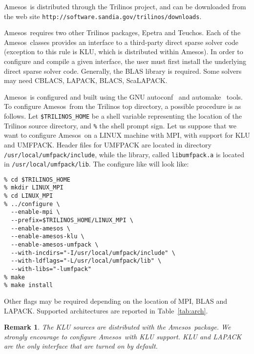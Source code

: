 \documentclass[11pt]{SANDreport}
\newcommand{\amesos}{{\sc Amesos}}
\newtheorem{remark}{Remark}
\begin{document}
\amesos\ is distributed through the Trilinos project, and can be
downloaded from the web site
\verb!http://software.sandia.gov/trilinos/downloads!.

\amesos\ requires two other {\sc Trilinos} packages, {\sc Epetra} and {\sc
  Teuchos}. 
Each of the \amesos\ classes provides an interface to a third-party direct
sparse solver code (exception to this rule is KLU, which is
  distributed within \amesos). In order to configure and compile a given
interface, the user must first install the underlying direct sparse
solver code. Generally, the BLAS library is required. Some solvers may
need CBLACS, LAPACK, BLACS, ScaLAPACK. 

\amesos\ is configured and built using the GNU autoconf~\cite{Autoconf}
and automake~\cite{Automake} tools. To configure \amesos\ from the
Trilinos top directory, a possible procedure is as follows.  Let
\verb!$TRILINOS_HOME! be a shell variable representing the location
of the Trilinos source directory, and \verb!%! the shell prompt sign.  
Let us suppose that we want to configure \amesos\ on a
LINUX machine with MPI, with support
for KLU and UMFPACK. Header files for UMFPACK are located
in directory \verb!/usr/local/umfpack/include!, while the library,
called \verb!libumfpack.a! is located in \verb!/usr/local/umfpack/lib!.
The configure like will look like:
\begin{verbatim}
% cd $TRILINOS_HOME
% mkdir LINUX_MPI
% cd LINUX_MPI
% ../configure \
  --enable-mpi \
  --prefix=$TRILINOS_HOME/LINUX_MPI \
  --enable-amesos \
  --enable-amesos-klu \
  --enable-amesos-umfpack \
  --with-incdirs="-I/usr/local/umfpack/include" \
  --with-ldflags="-L/usr/local/umfpack/lib" \
  --with-libs="-lumfpack"
% make
% make install
\end{verbatim}
Other flags may be required depending on the location of
 MPI, BLAS and LAPACK. Supported architectures are reported 
 in Table~\ref{tab:arch}.

\begin{remark}
The KLU sources are distributed with the \amesos\ package. We strongly
encourage to configure \amesos\ with KLU support. KLU and LAPACK are the only
interface that are turned on by default.
\end{remark}
\end{document}
